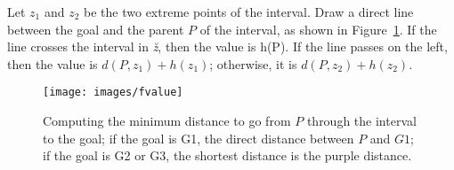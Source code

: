 Let $z_1$ and $z_2$ be the two extreme points of the interval.  
Draw a direct line between the goal and the parent $P$ of the interval, 
as shown in Figure~\ref{fig::fvalue}.  
If the line crosses the interval in \textit{\u z}, then the value is h(P).  If the line passes on the left, 
then the value is $d(P,z_1)+h(z_1)$; 
otherwise, it is $d(P,z_2)+h(z_2)$.  

\begin{figure}[ht]
  \begin{center}
    \texttt{[image: images/fvalue]}
  \end{center}
  \caption{Computing the minimum distance 
    to go from $P$ through the interval to the goal; 
    if the goal is G1, the direct distance between $P$ and $G1$; 
    if the goal is G2 or G3, 
    the shortest distance is the purple distance.}
  \label{fig::fvalue}
\end{figure}
